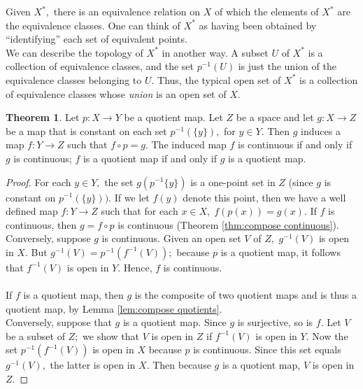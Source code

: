 \documentclass{article}
\theoremstyle{definition}
\newtheorem{theorem}{Theorem}[section]
\begin{document}
Given $X^*,$ there is an equivalence relation on $X$ of which the elements of $X^*$ are the equivalence classes. One can think of $X^*$ as having been obtained by ``identifying'' each set of equivalent points.\\
We can describe the topology of $X^*$ in another way. A subset $U$ of $X^*$ is a collection of equivalence classes, and the set $p^{-1}(U)$ is just the union of the equivalence classes belonging to $U.$ Thus, the typical open set of $X^*$ is a collection of equivalence classes whose \emph{union} is an open set of $X.$
%
\begin{theorem}
  Let $p:X\longrightarrow Y$ be a quotient map. Let $Z$ be a space and let $g:X\longrightarrow Z$ be a map that is constant on each set $p^{-1}(\{y\}),$ for $y\in Y.$ Then $g$ induces a map $f:Y\longrightarrow Z$ such that $f\circ p = g.$ The induced map $f$ is continuous if and only if $g$ is continuous; $f$ is a quotient map if and only if $g$ is a quotient map.
  \begin{center}
  \end{center}
\end{theorem}
\begin{proof}
  For each $y \in Y,$ the set $g(p^{-1}\{y\})$ is a one-point set in $Z$ (since $g$ is constant on $p^{-1}(\{y\})).$ If we let $f(y)$ denote this point, then we have a well defined map $f:Y \longrightarrow Z$ such that for each $x \in X,\; f(p(x)) = g(x).$ If $f$ is continuous, then $g = f \circ p$ is continuous (Theorem \ref{thm:compose continuous}).\\
  Conversely, suppose $g$ is continuous. Given an open set $V$ of $Z,$ $g^{-1}(V)$ is open in $X.$ But $g^{-1}(V) = p^{-1}(f^{-1}(V));$ because $p$ is a quotient map, it follows that $f^{-1}(V)$ is open in $Y.$ Hence, $f$ is continuous.\\~\\
  If $f$ is a quotient map, then $g$ is the composite of two quotient maps and is thus a quotient map, by Lemma \ref{lem:compose quotients}.\\
  Conversely, suppose that $g$ is a quotient map. Since $g$ is surjective, so is $f.$ Let $V$ be a subset of $Z;$ we show that $V$ is open in $Z$ if $f^{-1}(V)$ is open in $Y.$ Now the set $p^{-1}(f^{-1}(V))$ is open in $X$ because $p$ is continuous. Since this set equals $g^{-1}(V),$ the latter is open in $X.$ Then because $g$ is a quotient map, $V$ is open in $Z.$
\end{proof}
\end{document}
